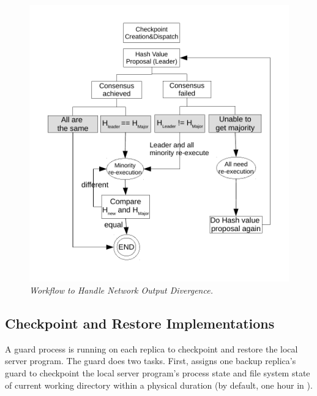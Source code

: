 % 



\begin{figure}[t]
\centering
\vspace{-.10in}
\includegraphics[width=.5\textwidth]{figures/output-divergence}
\vspace{-.50in}
\caption{{\em Workflow to Handle Network Output Divergence.}} 
\label{fig:divergence}
\vspace{-.20in}
\end{figure}

\subsection{Checkpoint and Restore Implementations} \label{sec:checkpoint}

A guard process is running on each replica to checkpoint and restore the local 
server program. The guard does two tasks. First, \xxx assigns one backup 
replica's guard to checkpoint the local server program's process state and file 
system state of current working directory within a physical duration 
\tcheckpoint (by default, one hour in \xxx).

